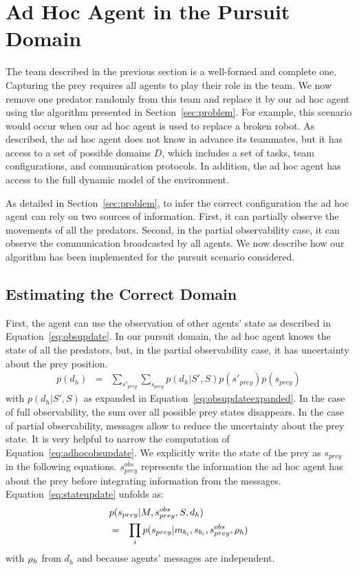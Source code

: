 \section{Ad Hoc Agent in the Pursuit Domain}
\label{sec:method}

The team described in the previous section is a well-formed and complete one. Capturing the prey requires all agents to play their role in the team. We now remove one predator randomly from this team and replace it by our ad hoc agent using the algorithm presented in Section~\ref{sec:problem}. For example, this scenario would occur when our ad hoc agent is used to replace a broken robot. As described, the ad hoc agent does not know in advance its teammates, but it has access to a set of possible domains $D$, which includes a set of tasks, team configurations, and communication protocols. In addition, the ad hoc agent has access to the full dynamic model of the environment.

As detailed in Section~\ref{sec:problem}, to infer the correct configuration the ad hoc agent can rely on two sources of information. First, it can partially observe the movements of all the predators. Second, in the partial observability case, it can observe the communication broadcasted by all agents. We now describe how our algorithm has been implemented for the pursuit scenario considered.

\subsection{Estimating the Correct Domain}

First, the agent can use the observation of other agents' state as described in Equation~\ref{eq:obsupdate}. In our pursuit domain, the ad hoc agent knows the state of all the predators, but, in the partial observability case, it has uncertainty about the prey position.
%
\begin{eqnarray}
p(d_h) &=& \sum_{s'_{prey}} \sum_{s_{prey}} p(d_h|S',S) p(s'_{prey}) p(s_{prey})  \label{eq:adhocobsupdate}
\end{eqnarray}
%
with $p(d_h|S',S)$ as expanded in Equation~\ref{eq:obsupdateexpanded}. In the case of full observability, the sum over all possible prey states disappears. In the case of partial observability, messages allow to reduce the uncertainty about the prey state. It is very helpful to narrow the computation of Equation~\ref{eq:adhocobsupdate}. We explicitly write the state of the prey as $s_{prey}$ in the following equations. $s^{obs}_{prey}$ represents the information the ad hoc agent has about the prey before integrating information from the messages. Equation~\ref{eq:stateupdate} unfolds as:
%
\begin{eqnarray}
\lefteqn{p(s_{prey}|M, s^{obs}_{prey}, S, d_h)} \nonumber \\  &=& \prod_i p(s_{prey}|m_{b_i}, s_{b_i}, s^{obs}_{prey}, \com_h)
\label{eq:preyestimate}
\end{eqnarray}
%
with $\rho_h$ from $d_h$ and because agents' messages are independent.

